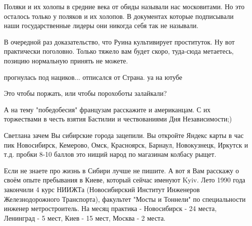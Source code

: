 \begin{itemize}
Поляки и их холопы в средние века от обиды называли нас московитами. Но это
осталось только у поляков и их холопов. В документах которые подписывали наши
государственные лидеры они никогда себя так не называли.

 
В очередной раз доказательство, что Руина культивирует проституток. Ну вот практически поголовно. Только тяжело вам будет скоро, туда-сюда метаетесь, позицию нормальную принять не можете.

 
прогнулась под нациков...
отписался от Страна. уа на ютубе

 
Это чтобы поржать, или чтобы порохоботы залайкали?

 
А на тему "победобесия" французам расскажите и американцам. С их торжествами в
честь взятия Бастилии и чествованиями Дня Независимости;)


Светлана зачем Вы сибирские города зацепили. Вы откройте Яндекс карты в час пик
Новосибирск, Кемерово, Омск, Красноярск, Барнаул, Новокузнецк, Иркутск и т.д.
пробки 8-10 баллов это нищий народ по магазинам колбасу рыщет. 

Если не знаете про жизнь в Сибири лучше не пишите. А вот я Вам расскажу о своём
опыте пребывания в Киеве, который сейчас именуют Kyiv. Лето 1990 года закончили
4 курс НИИЖТа (Новосибирский Институт Инженеров Железнодорожного Транспорта),
факультет "Мосты и Тоннели" по специальности инженер метростроитель. На месяц
практика - Новосибирск - 24 места, Ленинград - 5 мест, Киев - 15 мест, Москва -
2 места. 


\end{itemize}
